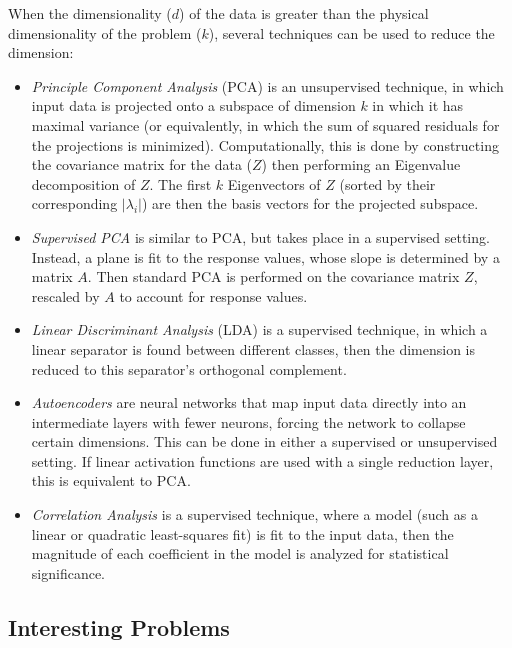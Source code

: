 \documentclass[12pt]{article}
\begin{document}
When the dimensionality ($d$) of the data is greater than the physical
dimensionality of the problem ($k$), several techniques can be used to
reduce the dimension:
\begin{itemize}
	\item {\it Principle Component Analysis} (PCA) is an unsupervised
		technique, in which input data is projected onto a subspace
		of dimension $k$ in which it has maximal variance (or
		equivalently, in which the sum of squared residuals for
		the projections is minimized). Computationally, this is
		done by constructing the covariance matrix for the data
		($Z$) then performing an Eigenvalue decomposition of $Z$.
		The first $k$ Eigenvectors of $Z$ (sorted by their
		corresponding $|\lambda_i|$) are then the basis vectors
		for the projected subspace.
	\item {\it Supervised PCA} is similar to PCA, but takes place in
		a supervised setting. Instead, a plane is fit to the
		response values, whose slope is determined by a matrix
		$A$. Then standard PCA is performed on the covariance
		matrix $Z$, rescaled by $A$ to account for response
		values.
	\item {\it Linear Discriminant Analysis} (LDA) is a supervised
		technique, in which a linear separator is found between
		different classes, then the dimension is reduced to this
		separator's orthogonal complement.
	\item {\it Autoencoders} are neural networks that map input data
		directly into an intermediate layers with fewer neurons,
		forcing the network to collapse certain dimensions. This
		can be done in either a supervised or unsupervised setting.
		If linear activation functions are used with a single
		reduction layer, this is equivalent to PCA.
	\item {\it Correlation Analysis} is a supervised technique, where
		a model (such as a linear or quadratic least-squares fit)
		is fit to the input data, then the magnitude of each
		coefficient in the model is analyzed for statistical
		significance.
\end{itemize}

\subsection*{Interesting Problems}
\end{document}
